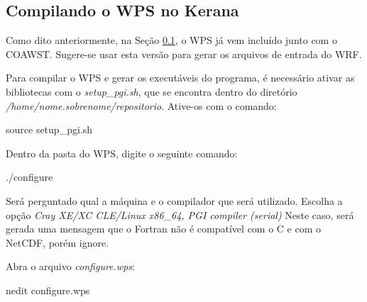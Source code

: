 \subsection{Compilando o WPS no Kerana}\label{wpsker}
\bigskip

\begin{tcolorbox}[enhanced,
  grow to left by=0cm,%
  grow to right by=0cm,%
  enlarge top by=0cm,%
  enlarge bottom by=0cm,%
  tcbox raise base,
  boxrule=1.0pt,
  left=18mm,
  colframe=red!50!black,coltext=red!25!black,colback=red!10!white,
  overlay={\begin{tcbclipinterior}\fill[red!75!blue!50!white] (frame.south west)
    rectangle node[text=white,font=\sffamily\bfseries\footnotesize,rotate=0] {ATENÇÃO} ([xshift=18mm]frame.north west);\end{tcbclipinterior}}]
Como dito anteriormente, na Seção \textcolor{bleu_cite}{\ref{wpsker}}, o WPS já vem incluído junto com o COAWST. Sugere-se usar esta versão para gerar os arquivos de entrada do WRF.
\end{tcolorbox}
\bigskip

\noindent Para compilar o WPS e gerar os executáveis do programa, é necessário ativar as bibliotecas com o \textit{setup\_pgi.sh}, que se encontra dentro do diretório \textit{/home/nome.sobrenome/repositorio}. Ative-os com o comando:
\bigskip

\begin{bashcode}
source setup_pgi.sh
\end{bashcode}
\bigskip

\noindent Dentro da pasta do WPS, digite o seguinte comando:
\bigskip

\begin{bashcode}
./configure
\end{bashcode}
\bigskip

\noindent Será perguntado qual a máquina e o compilador que será utilizado. Escolha a opção \textit{Cray XE/XC CLE/Linux x86\_64, PGI compiler (serial)} Neste caso, será gerada uma mensagem que o Fortran não é compatível com o C e com o NetCDF, porém ignore.
\bigskip

\noindent Abra o arquivo \textit{configure.wps}:
\bigskip

\begin{bashcode}
nedit configure.wps
\end{bashcode}
\bigskip

